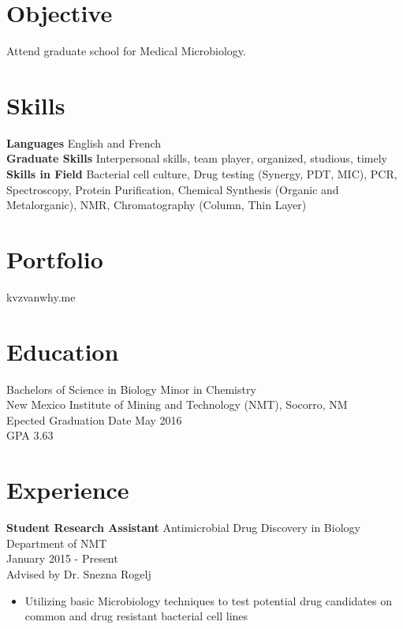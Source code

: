 \documentclass[margin]{res}
\begin{document}
 
 
 
\address{1007 Leroy Pl \\ Socorro, NM 87801  \\
        kzingler@nmt.edu}


 
\begin{resume} 
 
\section{Objective} 
Attend graduate school for Medical Microbiology.

\section{Skills} 
  {\bf Languages} English and French \\
  {\bf Graduate Skills} Interpersonal skills, team player, organized, studious, timely\\
  {\bf Skills in Field} Bacterial cell culture, Drug testing (Synergy, PDT, MIC), PCR, Spectroscopy, Protein Purification, Chemical Synthesis (Organic and Metalorganic), NMR, Chromatography (Column, Thin Layer) 
  
  \section{Portfolio}
  kvzvanwhy.me

\section{Education} 
 Bachelors of Science in Biology Minor in Chemistry\\
 New Mexico Institute of Mining and Technology (NMT), Socorro, NM\\
 Epected Graduation Date May 2016 \\
GPA 3.63 
 

\section{Experience}
{\bf Student Research Assistant}
Antimicrobial Drug Discovery in Biology Department of NMT\\
January 2015 - Present\\
Advised by Dr. Snezna Rogelj
\begin{itemize} \itemsep -2pt %
\item Utilizing basic Microbiology techniques to test potential drug candidates on common and drug resistant bacterial cell lines
\end{itemize}


\end{resume}
\end{document}
